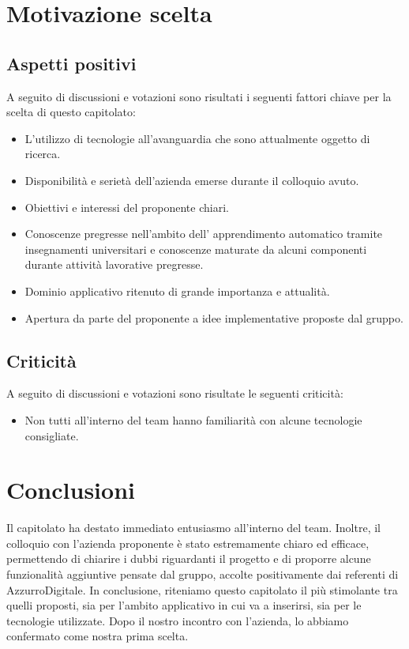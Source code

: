 \documentclass[12pt]{report}
\begin{document}
\section{Motivazione scelta}
\subsection{Aspetti positivi}
A seguito di discussioni e votazioni sono risultati i seguenti fattori chiave per la scelta di questo capitolato:
\begin{itemize}
    \item L’utilizzo di tecnologie all’avanguardia che sono attualmente oggetto di ricerca.
    \item Disponibilità e serietà dell’azienda emerse durante il colloquio avuto.
    \item Obiettivi e interessi del proponente chiari.
    \item Conoscenze pregresse nell’ambito dell' apprendimento automatico tramite insegnamenti universitari e conoscenze maturate da alcuni componenti durante attività lavorative pregresse.
    \item Dominio applicativo ritenuto di grande importanza e attualità.
    \item Apertura da parte del proponente a idee implementative proposte dal gruppo.

\end{itemize}

\subsection{Criticità}
A seguito di discussioni e votazioni sono risultate le seguenti criticità:
\begin{itemize}
    \item Non tutti all’interno del team hanno familiarità con alcune tecnologie consigliate.
\end{itemize}
\section{Conclusioni}
Il capitolato ha destato immediato entusiasmo all’interno del team. Inoltre, il colloquio con l’azienda proponente è stato estremamente chiaro ed efficace, permettendo di chiarire i dubbi riguardanti il progetto e di proporre alcune funzionalità aggiuntive pensate dal gruppo, accolte positivamente dai referenti di AzzurroDigitale. 
In conclusione, riteniamo questo capitolato il più stimolante tra quelli proposti, sia per l’ambito applicativo in cui va a inserirsi, sia per le tecnologie utilizzate. Dopo il nostro incontro con l’azienda, lo abbiamo confermato come nostra prima scelta. 
\end{document}
